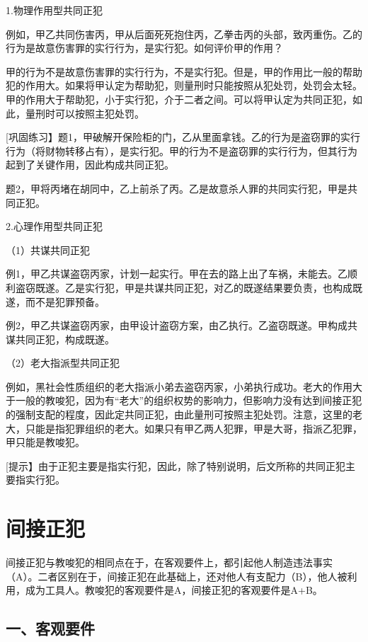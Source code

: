 1.物理作用型共同正犯

例如，甲乙共同伤害丙，甲从后面死死抱住丙，乙拳击丙的头部，致丙重伤。乙的行为是故意伤害罪的实行行为，是实行犯。如何评价甲的作用？

甲的行为不是故意伤害罪的实行行为，不是实行犯。但是，甲的作用比一般的帮助犯的作用大。如果将甲认定为帮助犯，则量刑时只能按照从犯处罚，处罚会太轻。甲的作用大于帮助犯，小于实行犯，介于二者之间。可以将甲认定为共同正犯，如此，量刑时可以按照主犯处罚。

[巩固练习】题1，甲破解开保险柜的门，乙从里面拿钱。乙的行为是盗窃罪的实行行为（将财物转移占有），是实行犯。甲的行为不是盗窃罪的实行行为，但其行为起到了关键作用，因此构成共同正犯。

题2，甲将丙堵在胡同中，乙上前杀了丙。乙是故意杀人罪的共同实行犯，甲是共同正犯。

2.心理作用型共同正犯

（1）共谋共同正犯

例1，甲乙共谋盗窃丙家，计划一起实行。甲在去的路上出了车祸，未能去。乙顺利盗窃既遂。乙是实行犯，甲是共谋共同正犯，对乙的既遂结果要负责，也构成既遂，而不是犯罪预备。

例2，甲乙共谋盗窃丙家，由甲设计盗窃方案，由乙执行。乙盗窃既遂。甲构成共谋共同正犯，构成既遂。

（2）老大指派型共同正犯

例如，黑社会性质组织的老大指派小弟去盗窃丙家，小弟执行成功。老大的作用大于一般的教唆犯，因为有“老大”的组织权势的影响力，但影响力没有达到间接正犯的强制支配的程度，因此定共同正犯，由此量刑可按照主犯处罚。注意，这里的老大，只能是指犯罪组织的老大。如果只有甲乙两人犯罪，甲是大哥，指派乙犯罪，甲只能是教唆犯。


[提示】由于正犯主要是指实行犯，因此，除了特别说明，后文所称的共同正犯主要指实行犯。

\section{间接正犯}

间接正犯与教唆犯的相同点在于，在客观要件上，都引起他人制造违法事实（A）。二者区别在于，间接正犯在此基础上，还对他人有支配力（B），他人被利用，成为工具人。教唆犯的客观要件是A，间接正犯的客观要件是A+B。


\subsection*{一、客观要件}

